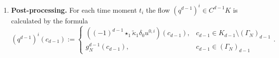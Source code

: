 \begin{algorithm}
\begin{enumerate}
\begin{itemize}
          the solution $\overline{x}^{i + 1}$ on the non-Dirichlet nodes
          (allocated only once, no need to store it every step),
          \begin{equation}
            \overline{x}^{i + 1} := \overline{w_\tau}^i + \overline{z_\tau};
          \end{equation}
        \item
          the final solution
          \begin{equation}
            x^{i + 1}_j :=
            \begin{cases}
              \overline{x}^{i + 1}_j, & j \in J \\
              g_D^0(N_j), & j \in I
            \end{cases}.
          \end{equation}
      \end{itemize}
    \item
      \textbf{Post-processing.}
      For each time moment $t_i$ the flow $(q^{d - 1})^i \in C^{d - 1} K$
      is calculated by the formula
      \begin{equation}
        (q^{d - 1})^i(c_{d - 1}) :=
        \begin{cases}
          ((-1)^{d - 1} \star_1 \tilde{\kappa}_1 \delta_0 u^{0,i})(c_{d - 1}),
            & c_{d - 1} \in K_{d - 1} \setminus (\Gamma_N)_{d - 1} \\
          g_N^{d - 1}(c_{d - 1}), & c_{d - 1} \in (\Gamma_N)_{d - 1}
        \end{cases}.
      \end{equation}
  \end{enumerate}
\end{algorithm}
